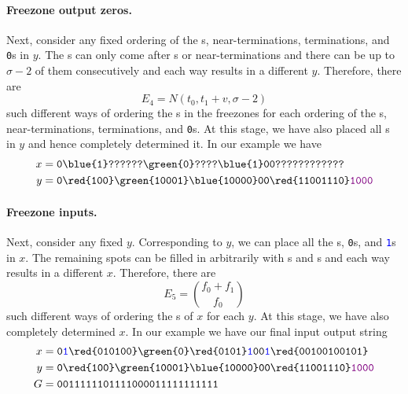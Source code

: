 \paragraph{Freezone output zeros.}
Next, consider any fixed ordering of the \texttt{}s, near-terminations, terminations, and \texttt{0}s in $y$. The \texttt{}s can only come after \texttt{}s or near-terminations and there can be up to $\sigma-2$ of them consecutively and each way results in a different $y$. Therefore, there are$$E_4=N(t_0,t_1+v,\sigma-2)$$such different ways of ordering the \texttt{}s in the freezones for each ordering of the \texttt{}s, near-terminations, terminations, and \texttt{0}s. At this stage, we have also placed all \texttt{}s in $y$ and hence completely determined it. In our example we have
\begin{align*}
  x&=\texttt{0\blue{1}??????\green{0}????\blue{1}00????????????}\\
  y&=\texttt{0\red{100}\green{10001}\blue{10000}00\red{11001110}\textcolor{violet}{1000}}
\end{align*}

\paragraph{Freezone inputs.}
Next, consider any fixed $y$. Corresponding to $y$, we can place all the \texttt{}s, \texttt{0}s, and \texttt{\textcolor{blue}{1}}s in $x$. The remaining spots can be filled in arbitrarily with \texttt{}s and \texttt{}s and each way results in a different $x$. Therefore, there are
$$
E_5=\binom{f_0+f_1}{f_0}
$$
such different ways of ordering the \texttt{}s of $x$ for each $y$. At this stage, we have also completely determined $x$. In our example we have our final input output string
\begin{align*}
  x&=\texttt{0\textcolor{blue}{1}\red{010100}\green{0}\red{0101}\textcolor{blue}{1}00\textcolor{blue}{1}\red{00100100101}}\\
  y&=\texttt{0\red{100}\green{10001}\blue{10000}00\red{11001110}\textcolor{violet}{1000}}\\
  G&=\texttt{0011111101111000011111111111}
\end{align*}


